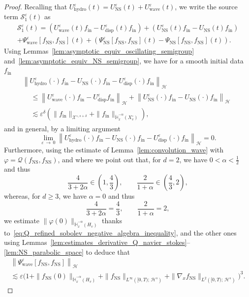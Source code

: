 \documentclass[10pt]{amsart}
\theoremstyle{definition}\newtheorem{defi}[theo]{Definition}\newtheorem{rema}[theo]{Remark}\newtheorem{exam}[theo]{Example}\newtheorem{exem}[theo]{Example}\newtheorem{nota}[theo]{Notation}
\newcommand{\ini}{\mathrm{in}}
\newcommand{\ns}{\mathrm{NS}}
\newcommand{\hyd}{\mathrm{hydro}}
\newcommand{\Wave}{\mathrm{wave}}
\newcommand{\disp}{\mathrm{disp}}
\newcommand{\bbH}{\mathbb{H}}
\newcommand{\XX}{\mathcal{X}}
\newcommand{\HH}{\mathcal{H}}
\newcommand{\QQ}{\mathcal{Q}}
\renewcommand{\SS}{\mathcal{S}}
\newcommand{\HHH}{\mathscr{H}}
\newcommand{\Ss}{H}
\newcommand{\rSSs}[1]{\HH^{#1}}
\newcommand{\SSSs}{\HHH}
\newcommand{\Slm}{X^{\circ}}
\newcommand{\rSSlm}[1]{\XX^{{\circ}, #1}}
\renewcommand*\le{\leqslant}
\renewcommand*\geq{\geqslant}
\newcommand*\eps{{\varepsilon}}
\begin{document}
\begin{proof}
Recalling that $U_\hyd^{\eps}(t)=U^{\eps}_{\ns}(t)+U_{\Wave}^{\eps}(t)$, we write the source term $\SS^\eps_1(t)$ as
\begin{multline*}
\SS^\eps_1(t) = \left(U^\eps_\Wave(t)f_{\ini} - U^\eps_\disp(t)f_{\ini}\right) + \left(U^\eps_\ns(t)f_{\ini} - U_\ns(t)f_{\ini}\right) \\
 + \Psi^\eps_\Wave\left[f_\ns, f_\ns\right](t) + \left(\Psi^\eps_\ns\left[f_\ns, f_\ns\right](t)- \Psi_\ns\left[f_\ns, f_\ns\right](t)\right).
\end{multline*}
Using Lemmas~\ref{lem:asymptotic_equiv_oscillating_semigroup} and~\ref{lem:asymptotic_equiv_NS_semigroup}, we have for a smooth initial data $f_\ini$
\begin{multline*}
\left\| U^\eps_\hyd(\cdot)f_\ini - U_\ns(\cdot)f_\ini - U^\eps_\disp(\cdot) f_\ini \right\|_\SSSs  \\
\begin{aligned}
 &\le \left\| U^\eps_\Wave(\cdot) f_\ini - U^\eps_\disp f_\ini \right\|_\SSSs + \left\| U^\eps_\ns(\cdot) f_\ini - U_\ns(\cdot) f_\ini \right\|_\SSSs \\
& \lesssim \eps^{\delta} \left(\| f_\ini \|_{\rSSlm{s+\delta}} + \| f_\ini \|_{ \dot{\bbH}^{-\alpha}_x \left(\Slm_v \right) } \right),
\end{aligned}
\end{multline*}
and in general, by a limiting argument
\[
\lim_{\eps\,\to\,0}\left\| U^\eps_\hyd(\cdot)f_\ini - U_\ns(\cdot)f_\ini - U^\eps_\disp(\cdot) f_\ini \right\|_\SSSs=0.
\]
Furthermore, using the estimate of Lemma~\ref{lem:convolution_wave} with $\varphi = \QQ(f_\ns, f_\ns)$, and where we point out that, for $d=2$, we have $0 < \alpha < \frac{1}{2}$ and thus
\[
\frac{4}{3 + 2 \alpha} \in \left(1, \frac{4}{3}\right), \qquad \frac{2}{1+\alpha} \in \left(\frac{4}{3}, 2\right),
\]
whereas, for $d \geq3$, we have $\alpha=0$ and thus
\[
\frac{4}{3 + 2 \alpha} = \frac{4}{3}, \qquad \frac{2}{1+\alpha} = 2,
\]
we estimate $ \| \varphi(0) \|_{ \dot{\bbH}_x^{-\alpha}(\Ss_v )}$ thanks to~\eqref{eq:Q_refined_sobolev_negative_algebra_inequality}, and the other ones using Lemmas~\ref{lem:estimates_derivative_Q_navier_stokes}--\ref{lem:NS_parabolic_space} to deduce that
\begin{multline*}
\left\| \Psi^\eps_\Wave\left[f_\ns, f_\ns\right] \right\|_{\SSSs}\\
\lesssim \eps \Big(1 + \| f_\ns(0) \|_{ \dot{\bbH}^{-\alpha}_x \left(\Ss_v \right) } + \| f_\ns \|_{ L^\infty\left([0, T);\,\rSSs{s} \right) } + \| \nabla_x f_\ns \|_{ L^2\left([0, T);\,\rSSs{s} \right) }\Big)^3.

\end{multline*}
\end{proof}
\end{document}
